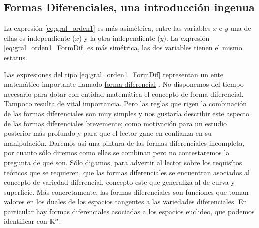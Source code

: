 \begin{subappendices}
 

\section{Formas Diferenciales, una introducción ingenua}%





 La  expresión \eqref{eq:gral_orden1} es más asimétrica, entre las variables $x$ e $y$ una de ellas es independiente ($x$) y la otra independiente  ($y$).  La expresión \eqref{eq:gral_orden1_FormDif}  es  más simétrica, las dos variables tienen el mismo estatus.

 Las expresiones del tipo \eqref{eq:gral_orden1_FormDif} representan un ente matemático importante llamado \href{http://es.wikipedia.org/wiki/Forma_diferencial}{forma diferencial} . No disponemos del tiempo necesario para dotar con entidad matemática el concepto de forma diferencial. Tampoco  resulta de vital importancia. Pero las reglas que rigen la combinación de las formas diferenciales son muy simples y nos gustaría describir este aspecto de las formas diferenciales brevemente; como motivación para un estudio posterior más profundo y para que el lector gane en confianza en su manipulación. Daremos así una pintura de las formas diferenciales incompleta, por cuanto sólo diremos como ellas se combinan pero no contestaremos la pregunta de que son. Sólo digamos, para advertir al lector sobre los requisítos teóricos que se requieren, que las formas diferenciales se encuentran asociados al concepto de variedad diferencial, concepto este que generaliza al de curva y superficie.  Más 
concretamente, las formas diferenciales son funciones que toman valores en los duales de los espacios tangentes a las variedades diferenciales. En particular hay formas diferenciales asociadas a los espacios euclideo, que podemos identificar con  $\mathbb{R}^n$.


\end{subappendices}
